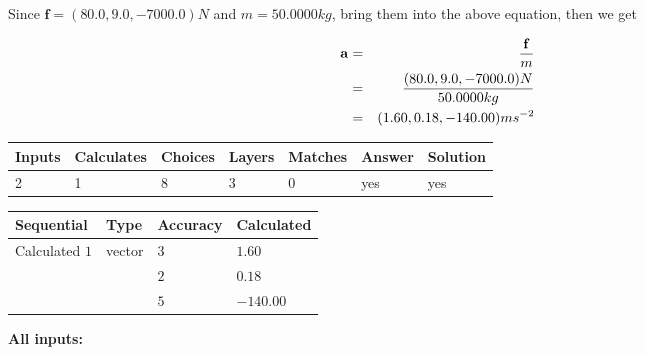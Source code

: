\documentclass[12pt]{article}
\begin{document}
Since $\mathbf{f}= %
(80.0 , 9.0 , -7000.0) N$
and $m= %
50.0000kg$, bring them into the above equation, then we get
 
\begin{eqnarray*}
\mathbf{a}&=&\frac{\mathbf{f}}m  \\
&=&\frac{ %
(80.0 , 9.0 , -7000.0) N}{ %
50.0000kg}  \\
&=& %
(1.60 , 0.18 , -140.00) ms^{-2}
\end{eqnarray*}
 
 
 
\noindent{}
 
 

 
\vspace{0.3in}
   
   
   
   
\noindent\begin{tabular}{|l|l|l|l|l|l|l|}
 \hline
Inputs & Calculates & Choices & Layers & Matches & Answer & Solution \\ \hline
           2  & 
           1  & 
           8
  & 
           3  & 
           0  & 
  yes & 
  yes 
  \\ \hline
 \end{tabular}
   
   
   
   
\noindent{}
   
   
  
  
\noindent\begin{tabular}{|l|l|l|l|}
\hline
 Sequential & Type & Accuracy & Calculated \\ 
\hline
 
 
  Calculated $            1 $ & vector &  
  $            3  $ 
 &  $ 1.60 $ 
 \\    
  & & 
  $            2  $ 
 &  $ 0.18 $ 
 \\    
  & & 
  $            5  $ 
 &  $ -140.00 $ 
 \\  \hline  
 \end{tabular}
   
   
   
   
\noindent\vspace{0.1in}\hspace{-0.08in} {\textbf{\Large{All inputs: }}}
   
   
  
\end{document}
